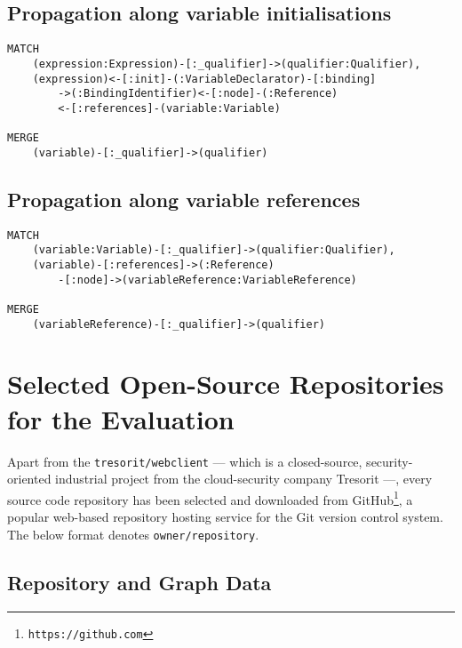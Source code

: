 \subsection{Propagation along variable initialisations}
\begin{lstlisting}[language=Cypher]
MATCH
    (expression:Expression)-[:_qualifier]->(qualifier:Qualifier),
    (expression)<-[:init]-(:VariableDeclarator)-[:binding]
        ->(:BindingIdentifier)<-[:node]-(:Reference)
        <-[:references]-(variable:Variable)

MERGE
    (variable)-[:_qualifier]->(qualifier)
\end{lstlisting}


\subsection{Propagation along variable references}
\begin{lstlisting}[language=Cypher]
MATCH
    (variable:Variable)-[:_qualifier]->(qualifier:Qualifier),
    (variable)-[:references]->(:Reference)
        -[:node]->(variableReference:VariableReference)

MERGE
    (variableReference)-[:_qualifier]->(qualifier)
\end{lstlisting}


\newpage
\section{Selected Open-Source Repositories for the Evaluation}

Apart from the \lstinline{tresorit/webclient} — which is a closed-source, security-oriented industrial project from the cloud-security company Tresorit —, every source code repository has been selected and downloaded from GitHub\footnote{\texttt{https://github.com}}, a popular web-based repository hosting service for the Git version control system. The below format denotes \lstinline{owner/repository}.


\subsection{Repository and Graph Data}

